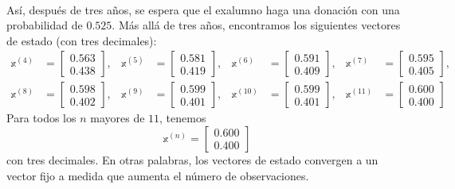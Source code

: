 \begin{example}
\begin{align*}
    \end{align*}
    Así, después de tres años, se espera que el exalumno haga una donación con una probabilidad de $0.525$. Más allá de tres años, encontramos los siguientes vectores de estado (con tres decimales):
    \begin{align*}
        \mathbb{x}^{(4)} & = \begin{bmatrix} 0.563 \\ 0.438 \end{bmatrix}, & \mathbb{x}^{(5)} & = \begin{bmatrix} 0.581 \\ 0.419 \end{bmatrix}, & \mathbb{x}^{(6)} & = \begin{bmatrix} 0.591 \\ 0.409 \end{bmatrix}, & \mathbb{x}^{(7)} & = \begin{bmatrix} 0.595 \\ 0.405 \end{bmatrix}, \\
        \mathbb{x}^{(8)} & = \begin{bmatrix} 0.598 \\ 0.402 \end{bmatrix}, & \mathbb{x}^{(9)} & = \begin{bmatrix} 0.599 \\ 0.401 \end{bmatrix}, & \mathbb{x}^{(10)} & = \begin{bmatrix} 0.599 \\ 0.401 \end{bmatrix}, & \mathbb{x}^{(11)} & = \begin{bmatrix} 0.600 \\ 0.400 \end{bmatrix}
    \end{align*}
    Para todos los $n$ mayores de $11$, tenemos
    $$\mathbb{x}^{(n)} = \begin{bmatrix} 0.600 \\ 0.400 \end{bmatrix}$$
    con tres decimales. En otras palabras, los vectores de estado convergen a un vector fijo a medida que aumenta el número de observaciones.
\end{example}

\newpage

